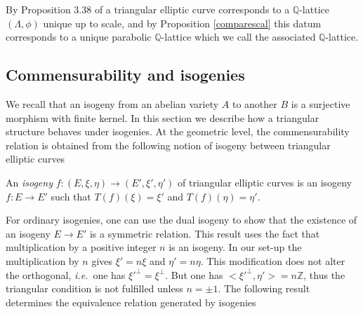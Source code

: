 \documentclass[graybox, envcountsect%
]{svmult}
\def\Q{{\mathbb Q}}
\def\Z{{\mathbb Z}}
\newcommand{\ie}{{\it i.e.\/}\ }
\def\no{\noindent}
\begin{document}
  \no By Proposition 3.38 of \cite{cmbook} a triangular elliptic curve corresponds to a $\Q$-lattice $(\Lambda,\phi)$ unique up to scale, and by Proposition \ref{comparescal} this datum  corresponds  to a unique parabolic $\Q$-lattice which we call the associated $\Q$-lattice.
 

\subsection{Commensurability and isogenies}\label{subsec:6.5}


We  recall that an isogeny from an abelian variety $A$ to another $B$ is a surjective morphism with finite kernel. 
In this section we describe how a triangular structure behaves under isogenies.  At the geometric level, the commensurability relation is obtained from the following notion of isogeny between triangular elliptic curves

\begin{definition}\label{isogendefn} An {\em isogeny} $f:(E,\xi,\eta)\to (E',\xi',\eta')$ of triangular elliptic curves is an isogeny $f: E\to E'$ such that $T(f)(\xi)=\xi'$ and  $T(f)(\eta)=\eta'$.	
 \end{definition}
 For ordinary isogenies, one can use the dual isogeny to show that  the existence of an isogeny $E\to E'$ is a symmetric relation. This result uses the fact that multiplication by a positive integer $n$ is an isogeny. In our set-up the multiplication by $n$ gives $\xi'=n\xi$ and $\eta'=n\eta$. This modification does not alter the orthogonal, \ie one has  $\xi'^\perp=\xi^\perp$. But one has $<\xi'^\perp,\eta'>=n\Z$, thus the triangular condition is not fulfilled unless $n=\pm 1$.\newline
  The following result determines the equivalence relation generated by isogenies
  
\end{document}
